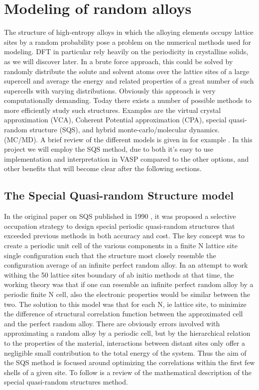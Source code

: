 \chapter{Modeling of random alloys}
\label{sec:SQS}

The structure of high-entropy alloys in which the alloying elements occupy lattice sites by a random probability pose a problem on the numerical methods used for modeling. DFT in particular rely heavily on the periodicity in crystalline solids, as we will discover later. 
In a brute force approach, this could be solved by randomly distribute the solute and solvent atoms over the lattice sites of a large supercell and average the energy and related properties of a great number of such supercells with varying distributions. Obviously this approach is very computationally demanding. Today there exists a number of possible methods to more efficiently study such structures. Examples are the virtual crystal approximation (VCA), Coherent Potential approximation (CPA), special quasi-random structure (SQS), and hybrid monte-carlo/molecular dynamics. (MC/MD). A brief review of the different models is given in for example \cite{sqsIntro}. In this project we will employ the SQS method, due to both it's easy to use implementation and interpretation in VASP compared to the other options, and other benefits that will become clear after the following sections.             

\section{The Special Quasi-random Structure model}
In the original paper on SQS published in 1990 \cite{sqsfull}, it was proposed a selective occupation strategy to design special periodic quasi-random structures that exceeded previous methods in both accuracy and cost. The key concept was to create a periodic unit cell of the various components in a finite N lattice site single configuration such that the structure most closely resemble the configuration average of an infinite perfect random alloy. In an attempt to work withing the 50 lattice sites boundary of ab initio methods at that time, the working theory was that if one can resemble an infinite perfect random alloy by a periodic finite N cell, also the electronic properties would be similar between the two. The solution to this model was that for each N, ie lattice site, to minimize the difference of structural correlation function between the approximated cell and the perfect random alloy. There are obviously errors involved with approximating a random alloy by a periodic cell, but by the hierarchical relation to the properties of the material, interactions between distant sites only offer a negligible small contribution to the total energy of the system. Thus the aim of the SQS method is focused around optimizing the correlations within the first few shells of a given site. To follow is a review of the mathematical description of the special quasi-random structures method.

